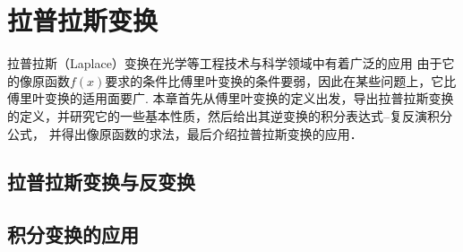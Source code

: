 \chapter{拉普拉斯变换}
拉普拉斯（Laplace）变换在光学等工程技术与科学领域中有着广泛的应用
% 
由于它的像原函数$f(x)$要求的条件比傅里叶变换的条件要弱，因此在某些问题上，它比傅里叶变换的适用面要广.
本章首先从傅里叶变换的定义出发，导出拉普拉斯变换的定义，并研究它的一些基本性质，然后给出其逆变换的积分表达式--复反演积分公式，
并得出像原函数的求法，最后介绍拉普拉斯变换的应用．
\section{拉普拉斯变换与反变换}
\label{sec:laplace_transform_and_inverse_transform}



\section{积分变换的应用}
\label{sec:integral_transform_applications}
